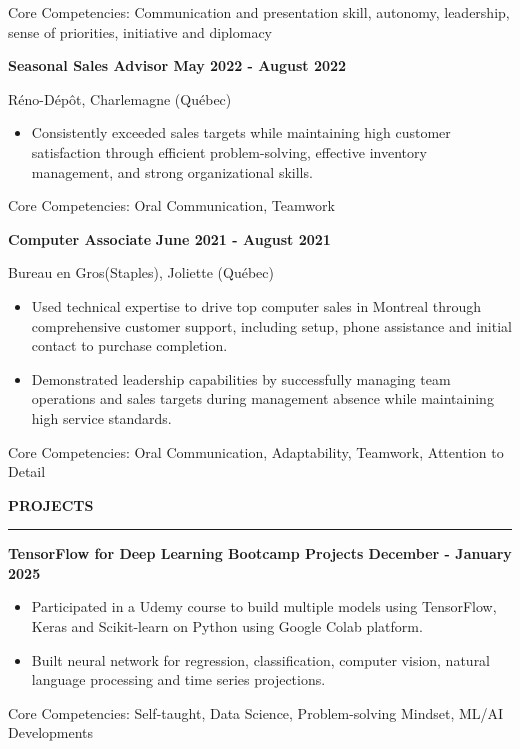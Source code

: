 \documentclass[letterpaper,11pt]{article}
\begin{document}
Core Competencies: Communication and presentation skill, autonomy,
leadership, sense of priorities, initiative and diplomacy
\vspace{-5pt}

\textbf{Seasonal Sales Advisor \hfill May 2022 - August 2022}
\par
\vspace{-15pt}
Réno-Dépôt, Charlemagne (Québec)

\begin{itemize}
\setlength{\itemsep}{-3pt}
\item 
Consistently exceeded sales targets while maintaining high customer satisfaction through efficient problem-solving, effective inventory management, and strong organizational skills.
\end{itemize}

Core Competencies: Oral Communication, Teamwork
\vspace{-5pt}

\textbf{Computer Associate} \hfill \textbf{June 2021 - August 2021} 
\par
\vspace{-15pt}
Bureau en Gros(Staples), Joliette (Québec)

\begin{itemize}
\setlength{\itemsep}{-3pt}
\item
Used technical expertise to drive top computer sales in Montreal through comprehensive customer support, including setup, phone assistance and initial contact to purchase completion.
\item
Demonstrated leadership capabilities by successfully managing team operations and sales targets during management absence while maintaining high service standards.
\end{itemize}
Core Competencies: Oral Communication, Adaptability, Teamwork, Attention
to Detail
\vspace{-5pt}

\textbf{PROJECTS}\par
\vspace{-20pt}
\rule{\textwidth}{0.4pt}

\textbf{TensorFlow for Deep Learning Bootcamp Projects \hfill December - January 2025}
\begin{itemize}
\setlength{\itemsep}{-3pt}
\item
Participated in a Udemy course to build multiple models using TensorFlow, Keras and Scikit-learn on Python using Google Colab platform.
\item
Built neural network for regression, classification, computer vision, natural language processing and time series projections.
\end{itemize}
Core Competencies: Self-taught, Data Science, Problem-solving Mindset, ML/AI Developments
\end{document}
